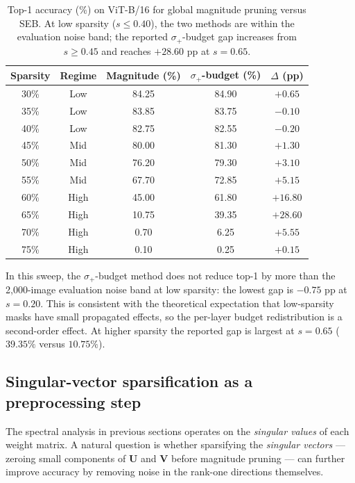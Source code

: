 \documentclass[11pt]{article}
\theoremstyle{plain}
\theoremstyle{definition}
\theoremstyle{remark}
\newcommand{\1}{\mathbf{1}}
\begin{document}
\begin{table}[ht]
\centering
\caption{Top-1 accuracy (\%) on ViT-B/16 for global magnitude pruning versus SEB.  At low sparsity (\(s\le 0.40\)), the two methods are within the evaluation noise band; the reported \(\sigma_+\)-budget gap increases from \(s\ge 0.45\) and reaches \(+28.60\) pp at \(s=0.65\).}
\label{tab:final_comparison}
\begin{tabular}{ccccc}
\toprule
Sparsity & Regime & Magnitude (\%) & \(\sigma_+\)-budget (\%) & \(\Delta\) (pp) \\
\midrule
30\% & Low & 84.25 & 84.90 & \(+0.65\) \\
35\% & Low & 83.85 & 83.75 & \(-0.10\) \\
40\% & Low & 82.75 & 82.55 & \(-0.20\) \\
\midrule
45\% & Mid & 80.00 & 81.30 & \(+1.30\) \\
50\% & Mid & 76.20 & 79.30 & \(+3.10\) \\
55\% & Mid & 67.70 & 72.85 & \(+5.15\) \\
\midrule
60\% & High & 45.00 & 61.80 & \(+16.80\) \\
65\% & High & 10.75 & 39.35 & \(+28.60\) \\
70\% & High & 0.70 & 6.25 & \(+5.55\) \\
75\% & High & 0.10 & 0.25 & \(+0.15\) \\
\bottomrule
\end{tabular}
\end{table}

In this sweep, the \(\sigma_+\)-budget method does not reduce top-1 by more than the 2{,}000-image evaluation noise band at low sparsity: the lowest gap is \(-0.75\) pp at \(s=0.20\).  This is consistent with the theoretical expectation that low-sparsity masks have small propagated effects, so the per-layer budget redistribution is a second-order effect.  At higher sparsity the reported gap is largest at \(s=0.65\) (\(39.35\%\) versus \(10.75\%\)).

\subsection{Singular-vector sparsification as a preprocessing step}
\label{subsec:sv_preprocessing}

The spectral analysis in previous sections operates on the \emph{singular values} of each weight matrix.  A natural question is whether sparsifying the \emph{singular vectors} --- zeroing small components of \(\mathbf{U}\) and \(\mathbf{V}\) before magnitude pruning --- can further improve accuracy by removing noise in the rank-one directions themselves.
\end{document}
